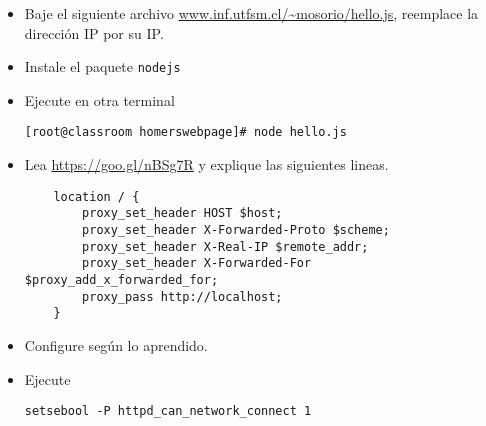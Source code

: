\documentclass[11pt]{exam}
\begin{document}
\begin{itemize}
	\item Baje el siguiente archivo \url{www.inf.utfsm.cl/~mosorio/hello.js}, reemplace la dirección IP por su IP.
	\item Instale el paquete \texttt{nodejs}
	\item Ejecute en otra terminal 
	\begin{lstlisting}
[root@classroom homerswebpage]# node hello.js
	\end{lstlisting}
	\item Lea \url{https://goo.gl/nBSg7R} y explique las siguientes lineas.
	\begin{lstlisting}
    location / {
        proxy_set_header HOST $host;
        proxy_set_header X-Forwarded-Proto $scheme;
        proxy_set_header X-Real-IP $remote_addr;
        proxy_set_header X-Forwarded-For $proxy_add_x_forwarded_for;
        proxy_pass http://localhost;
    }
	\end{lstlisting}
					\vspace{3in}
	\item Configure según lo aprendido.
	\item Ejecute
	\begin{lstlisting}
setsebool -P httpd_can_network_connect 1		
	\end{lstlisting}
\end{itemize}
\end{document}

